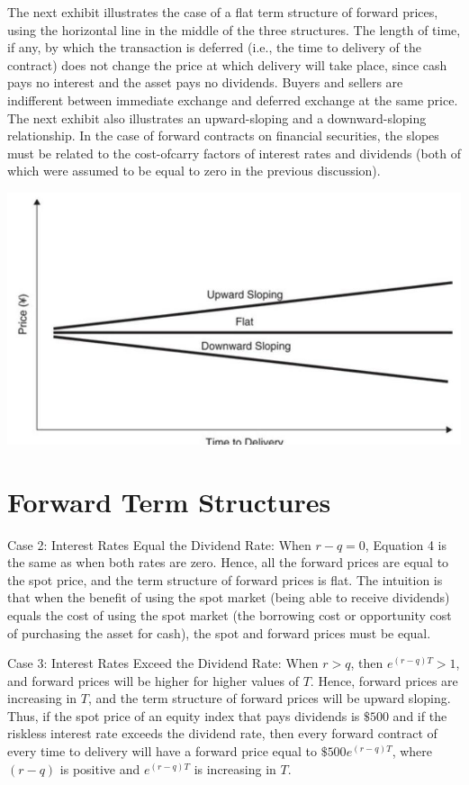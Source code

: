\documentclass[11pt]{article}
\begin{document}
The next exhibit illustrates the case of a flat term structure of forward prices, using the horizontal line in the middle of the three structures. The length of time, if any, by which the transaction is deferred (i.e., the time to delivery of the contract) does not change the price at which delivery will take place, since cash pays no interest and the asset pays no dividends. Buyers and sellers are indifferent between immediate exchange and deferred exchange at the same price. The next exhibit also illustrates an upward-sloping and a downward-sloping relationship. In the case of forward contracts on financial securities, the slopes must be related to the cost-ofcarry factors of interest rates and dividends (both of which were assumed to be equal to zero in the previous discussion).

\begin{center}
\includegraphics[max width=\textwidth]{2024_04_10_26637806882eb3fbfa51g-04}
\end{center}

\section*{Forward Term Structures}
Case 2: Interest Rates Equal the Dividend Rate: When $r-q=0$, Equation 4 is the same as when both rates are zero. Hence, all the forward prices are equal to the spot price, and the term structure of forward prices is flat. The intuition is that when the benefit of using the spot market (being able to receive dividends) equals the cost of using the spot market (the borrowing cost or opportunity cost of purchasing the asset for cash), the spot and forward prices must be equal.

Case 3: Interest Rates Exceed the Dividend Rate: When $r>q$, then $e^{(r-q) T}>1$, and forward prices will be higher for higher values of $T$. Hence, forward prices are increasing in $T$, and the term structure of forward prices will be upward sloping. Thus, if the spot price of an equity index that pays dividends is $\$ 500$ and if the riskless interest rate exceeds the dividend rate, then every forward contract of every time to delivery will have a forward price equal to $\$ 500 e^{(r-q) T}$, where $(r-q)$ is positive and $e^{(r-q) T}$ is increasing in $T$.
\end{document}
